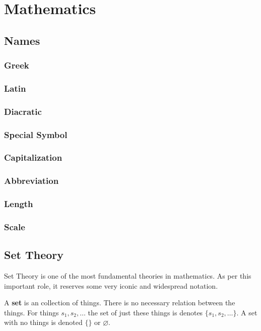 \documentclass{article}
\newcommand{\definition}[1]{
	\vspace{10px}
	\noindent {[\sc Definition]} #1
	\vspace{10px}
}
\begin{document}
\section{Mathematics}

\subsection{Names}

\subsubsection{Greek}
\subsubsection{Latin}
\subsubsection{Diacratic}
\subsubsection{Special Symbol}
\subsubsection{Capitalization}
\subsubsection{Abbreviation}
\subsubsection{Length}
\subsubsection{Scale}

\subsection{Set Theory}

	Set Theory is one of the most fundamental theories in mathematics. As per this important role, it reserves some very iconic and widespread notation.

	\definition{A \textbf{set} is an collection of things. There is no necessary relation between the things. For things $s_1, s_2, \dots$ the set of just these things is denotes $\{ s_1, s_2, \dots \}$. A set with no things is denoted $\{\}$ or $\varnothing$.}
\end{document}
